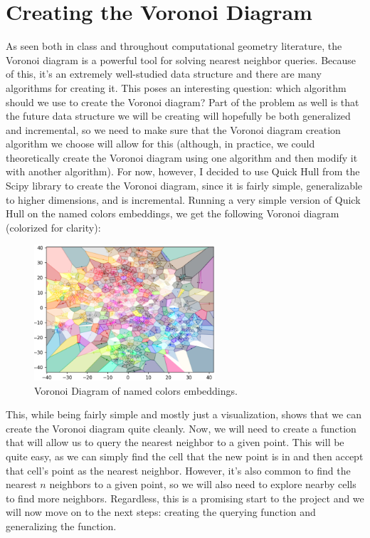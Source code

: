 \documentclass{article}
\begin{document}
\section{Creating the Voronoi Diagram}
As seen both in class and throughout computational geometry literature, 
the Voronoi diagram is a powerful tool for solving nearest neighbor queries.
Because of this, it's an extremely well-studied data structure and there are
many algorithms for creating it. This poses an interesting question: which
algorithm should we use to create the Voronoi diagram? Part of the problem as well is that the future data structure
we will be creating will hopefully be both generalized and incremental, so
we need to make sure that the Voronoi diagram creation algorithm we choose
will allow for this (although, in practice, we could theoretically create
the Voronoi diagram using one algorithm and then modify it with another algorithm).
For now, however, I decided to use Quick Hull from the Scipy library to create the Voronoi diagram\cite{scipyVoronoi}, since
it is fairly simple, generalizable to higher dimensions, and is incremental.
Running a very simple version of Quick Hull on the named colors embeddings, we get
the following Voronoi diagram (colorized for clarity):

\begin{figure}[H]
\centering
\includegraphics[width=0.6\textwidth]{images/tsne_voronoi_diagram.png}
\caption{Voronoi Diagram of named colors embeddings.}
\label{fig:voronoidiagram}
\end{figure}

\noindent
This, while being fairly simple and mostly just a visualization,
shows that we can create the Voronoi diagram quite cleanly. Now, 
we will need to create a function that will allow us to query the
nearest neighbor to a given point. This will be quite easy, as we
can simply find the cell that the new point is in and then accept
that cell's point as the nearest neighbor. However, it's also common
to find the nearest $n$ neighbors to a given point, so we will also
need to explore nearby cells to find more neighbors. Regardless, this
is a promising start to the project and we will now move on to the 
next steps: creating the querying function and generalizing the function.
\end{document}
